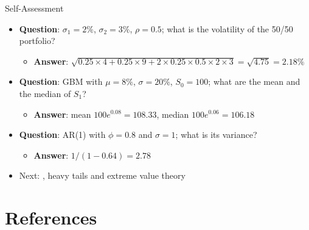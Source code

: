 \begin{frame}{Self-Assessment}
\itemsize{\small}
\begin{itemize}
    \item \textbf{Question}: $\sigma_1 = 2\%$, $\sigma_2 = 3\%$, $\rho = 0.5$; what is the volatility of the 50/50 portfolio?
    \begin{itemize}
        \item \textbf{Answer}: $\sqrt{0.25 \times 4 + 0.25 \times 9 + 2 \times 0.25 \times 0.5 \times 2 \times 3} = \sqrt{4.75} = 2.18\%$
    \end{itemize}
    \item \textbf{Question}: GBM with $\mu = 8\%$, $\sigma = 20\%$, $S_0 = 100$; what are the mean and the median of $S_1$?
    \begin{itemize}
        \item \textbf{Answer}: mean $100e^{0.08} = 108.33$, median $100e^{0.06} = 106.18$
    \end{itemize}
    \item \textbf{Question}: AR(1) with $\phi = 0.8$ and $\sigma = 1$; what is its variance?
    \begin{itemize}
        \item \textbf{Answer}: $1/(1 - 0.64) = 2.78$
    \end{itemize}
    \item Next: , heavy tails and extreme value theory
\end{itemize}
\end{frame}


\section{References}

